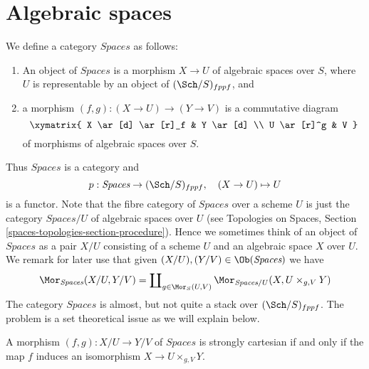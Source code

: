 \section{Algebraic spaces}
\label{section-stack-of-spaces}

\noindent
We define a category $\textit{Spaces}$ as follows:
\begin{enumerate}
\item An object of $\textit{Spaces}$ is a morphism $X \to U$
of algebraic spaces over $S$, where $U$ is representable by an object of
$(\Sch/S)_{fppf}$, and
\item a morphism $(f, g) : (X \to U) \to (Y \to V)$
is a commutative diagram
$$
\xymatrix{
X \ar[d] \ar[r]_f & Y \ar[d] \\
U \ar[r]^g & V
}
$$
of morphisms of algebraic spaces over $S$.
\end{enumerate}
Thus $\textit{Spaces}$ is a category and
$$
p : \textit{Spaces} \to (\Sch/S)_{fppf},
\quad
(X \to U) \mapsto U
$$
is a functor. Note that the fibre category of $\textit{Spaces}$ over
a scheme $U$ is just the category $\textit{Spaces}/U$ of
algebraic spaces over $U$ (see
Topologies on Spaces, Section \ref{spaces-topologies-section-procedure}).
Hence we sometimes think of an object of $\textit{Spaces}$ as a
pair $X/U$ consisting of a scheme $U$ and an algebraic space $X$ over $U$.
We remark for later use that given
$(X/U), (Y/V) \in \Ob(\textit{Spaces})$
we have
\begin{equation}
\label{equation-morphisms-spaces}
\Mor_{\textit{Spaces}}(X/U, Y/V)
=
\coprod\nolimits_{g \in \Mor_S(U, V)}
\Mor_{\textit{Spaces}/U}(X, U \times_{g, V} Y)
\end{equation}
The category $\textit{Spaces}$ is almost, but not quite a stack
over $(\Sch/S)_{fppf}$. The problem is a set theoretical
issue as we will explain below.

\begin{lemma}
\label{lemma-spaces-strongly-cartesian}
A morphism $(f, g) : X/U \to Y/V$
of $\textit{Spaces}$ is strongly cartesian if and only if the
map $f$ induces an isomorphism $X \to U \times_{g, V} Y$.
\end{lemma}

